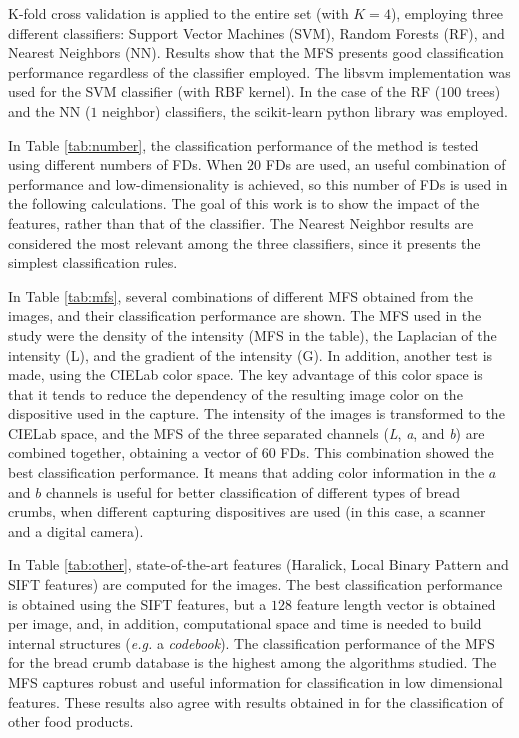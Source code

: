 \documentclass[a4paper,10pt]{article}
\begin{document}
K-fold cross validation is applied to the entire set (with $K=4$), employing three different classifiers: Support Vector Machines (SVM), Random Forests (RF), and Nearest Neighbors (NN). Results show that the MFS presents good classification performance regardless of the classifier employed. The libsvm implementation \cite{Chang2011} was used for the SVM classifier (with RBF kernel). In the case of the RF ($100$ trees) and the NN ($1$ neighbor) classifiers, the scikit-learn python library was employed.

In Table \ref{tab:number}, the classification performance of the method is tested using different numbers of FDs. When $20$ FDs are used, an useful combination of performance and low-dimensionality is achieved, so this number of FDs is used in the following calculations. The goal of this work is to show the impact of the features, rather than that of the classifier. The Nearest Neighbor results are considered the most relevant among the three classifiers, since it presents the simplest classification rules.

In Table \ref{tab:mfs}, several combinations of different MFS obtained from the images, and their classification performance are shown. The MFS used in the study were the density of the intensity (MFS in the table), the Laplacian of the intensity (L), and the gradient of the intensity (G). In addition, another test is made, using the CIELab color space. The key advantage of this color space is that it tends to reduce the dependency of the resulting image color on the dispositive used in the capture. The intensity of the images is transformed to the CIELab space, and the MFS of the three separated channels ({\em L}, {\em a}, and {\em b}) are combined together, obtaining a vector of $60$ FDs. This combination showed the best classification performance. It means that adding color information in the $a$ and $b$ channels is useful for better classification of different types of bread crumbs, when different capturing dispositives are used (in this case, a scanner and a digital camera).

In Table \ref{tab:other}, state-of-the-art features (Haralick, Local Binary Pattern and SIFT features) are computed for the images. The best classification performance is obtained using the SIFT features, but a $128$ feature length vector is obtained per image, and, in addition, computational space and time is needed to build internal structures ({\em e.g.} a {\em codebook}). The classification performance of the MFS for the bread crumb database is the highest among the algorithms studied. The MFS captures robust and useful information for classification in low dimensional features. These results also agree with results obtained in \cite{Bosch2011} for the classification of other food products.
\end{document}
